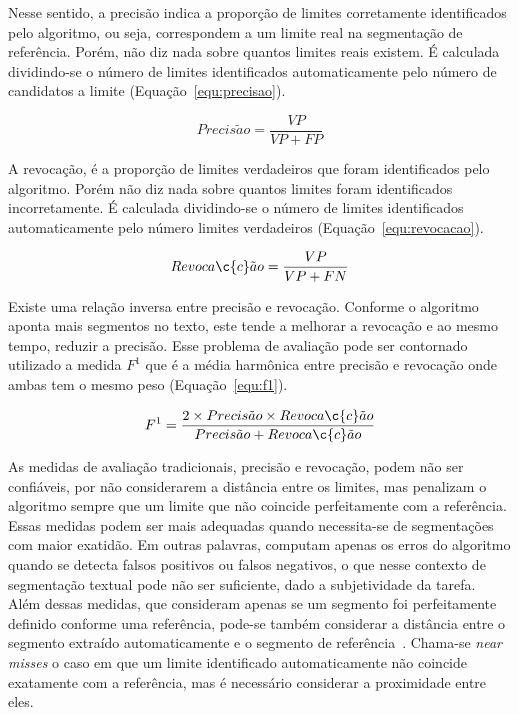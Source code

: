 Nesse sentido, a precisão indica a proporção de limites corretamente identificados pelo algoritmo, ou seja, correspondem a um limite real na segmentação de referência. 
Porém, não diz nada sobre quantos limites reais existem. 
É calculada dividindo-se o número de limites identificados automaticamente pelo número de candidatos a limite (Equação~\ref{equ:precisao}).
 
 \begin{equation}
	 Precis\tilde{a}o = \frac{VP}{VP+FP}
	 \label{equ:precisao}
 \end{equation}



 A revocação, é a proporção de limites verdadeiros que foram identificados pelo algoritmo. Porém não diz nada sobre quantos limites foram identificados incorretamente. É calculada dividindo-se o número de limites identificados automaticamente pelo número limites verdadeiros (Equação~\ref{equ:revocacao}).
 
 \begin{equation}
	 Revoca\c{c}\tilde{a}o = \frac{VP}{VP+FN}
	 \label{equ:revocacao}
 \end{equation}

 Existe uma relação inversa entre precisão e revocação. Conforme o algoritmo aponta mais segmentos no texto, este tende a melhorar a revocação e ao mesmo tempo, reduzir a precisão. Esse problema de avaliação pode ser contornado utilizado a medida $F^1$ que é a média harmônica entre precisão e revocação onde ambas tem o mesmo peso (Equação~\ref{equ:f1}). 

 \begin{equation}
	 F^1 = \frac{2 \times Precis\tilde{a}o \times Revoca\c{c}\tilde{a}o}
		        {Precis\tilde{a}o + Revoca\c{c}\tilde{a}o}
	 \label{equ:f1}
 \end{equation}






As medidas de avaliação tradicionais, precisão e revocação, podem não ser confiáveis, por não considerarem a distância entre os limites, mas penalizam o algoritmo sempre que um limite que não coincide perfeitamente com a referência. Essas medidas podem ser mais adequadas quando necessita-se de segmentações com maior exatidão. Em outras palavras, computam apenas os erros do algoritmo quando se detecta falsos positivos ou falsos negativos, o que nesse contexto de segmentação textual pode não ser suficiente, dado a subjetividade da tarefa. Além dessas medidas, que consideram apenas se um segmento foi perfeitamente definido conforme uma referência, pode-se também considerar a distância entre o segmento extraído automaticamente e o segmento de referência~\cite{Kern2009}. Chama-se \textit{near misses} o caso em que um limite identificado automaticamente não coincide exatamente com a referência, mas é necessário considerar a proximidade entre eles.

